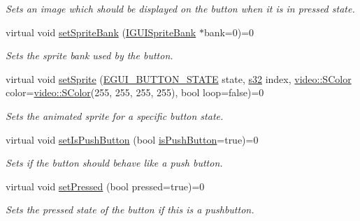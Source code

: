 \begin{DoxyCompactItemize}
\begin{DoxyCompactList}\small\item\em Sets an image which should be displayed on the button when it is in pressed state. \end{DoxyCompactList}\item 
\mbox{\label{classirr_1_1gui_1_1IGUIButton_a0570cc64a1445866a0c8123c0209c83d}} 
virtual void \hyperlink{classirr_1_1gui_1_1IGUIButton_a0570cc64a1445866a0c8123c0209c83d}{set\+Sprite\+Bank} (\hyperlink{classirr_1_1gui_1_1IGUISpriteBank}{I\+G\+U\+I\+Sprite\+Bank} $\ast$bank=0)=0
\begin{DoxyCompactList}\small\item\em Sets the sprite bank used by the button. \end{DoxyCompactList}\item 
virtual void \hyperlink{classirr_1_1gui_1_1IGUIButton_a26c5f05e922b0fc1b5790a001fd04b78}{set\+Sprite} (\hyperlink{namespaceirr_1_1gui_a2520445dec46e00684645ef8053aebb5}{E\+G\+U\+I\+\_\+\+B\+U\+T\+T\+O\+N\+\_\+\+S\+T\+A\+TE} state, \hyperlink{namespaceirr_ac66849b7a6ed16e30ebede579f9b47c6}{s32} index, \hyperlink{classirr_1_1video_1_1SColor}{video\+::\+S\+Color} color=\hyperlink{classirr_1_1video_1_1SColor}{video\+::\+S\+Color}(255, 255, 255, 255), bool loop=false)=0
\begin{DoxyCompactList}\small\item\em Sets the animated sprite for a specific button state. \end{DoxyCompactList}\item 
virtual void \hyperlink{classirr_1_1gui_1_1IGUIButton_a992775637ba91f5267c4c04d5889fc6d}{set\+Is\+Push\+Button} (bool \hyperlink{classirr_1_1gui_1_1IGUIButton_abb12a92ba70d1fe738655d04ef73734f}{is\+Push\+Button}=true)=0
\begin{DoxyCompactList}\small\item\em Sets if the button should behave like a push button. \end{DoxyCompactList}\item 
\mbox{\label{classirr_1_1gui_1_1IGUIButton_a2508fb292fab222bcebdeae0f9874348}} 
virtual void \hyperlink{classirr_1_1gui_1_1IGUIButton_a2508fb292fab222bcebdeae0f9874348}{set\+Pressed} (bool pressed=true)=0
\begin{DoxyCompactList}\small\item\em Sets the pressed state of the button if this is a pushbutton. \end{DoxyCompactList}\item 

\end{DoxyCompactItemize}

